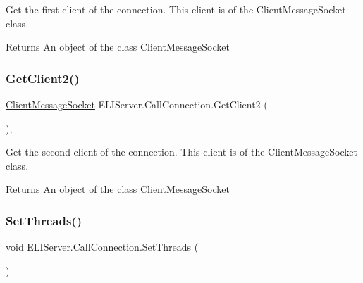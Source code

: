 Get the first client of the connection. This client is of the Client\+Message\+Socket class. 

\begin{DoxyReturn}{Returns}
An object of the class Client\+Message\+Socket
\end{DoxyReturn}
\mbox{\label{class_e_l_i_server_1_1_call_connection_ad424584ee59e02e9a3ac7b1993694683}} 
\subsubsection{\texorpdfstring{Get\+Client2()}{GetClient2()}}
{\footnotesize\ttfamily \hyperlink{class_e_l_i_server_1_1_messaging_1_1_client_message_socket}{Client\+Message\+Socket} E\+L\+I\+Server.\+Call\+Connection.\+Get\+Client2 (\begin{DoxyParamCaption}{ }\end{DoxyParamCaption})\hspace{0.3cm}{\ttfamily [inline]}, {\ttfamily [package]}}



Get the second client of the connection. This client is of the Client\+Message\+Socket class. 

\begin{DoxyReturn}{Returns}
An object of the class Client\+Message\+Socket
\end{DoxyReturn}
\mbox{\label{class_e_l_i_server_1_1_call_connection_ac9a3d9918d1739e322cc9a4a6fdcbeeb}} 
\subsubsection{\texorpdfstring{Set\+Threads()}{SetThreads()}}
{\footnotesize\ttfamily void E\+L\+I\+Server.\+Call\+Connection.\+Set\+Threads (\begin{DoxyParamCaption}{ }\end{DoxyParamCaption})\hspace{0.3cm}{\ttfamily [inline]}}





